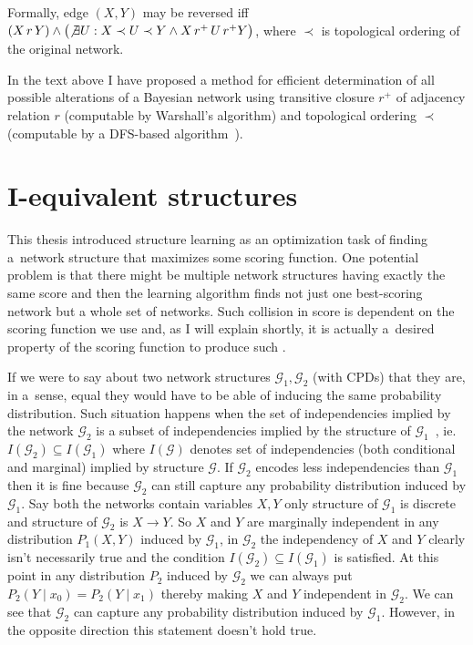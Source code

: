 \documentclass[english,cover]{fitthesis} %
\begin{document}
Formally, edge $(X,Y)$ may be reversed iff $(X \, r \, Y) \land \bigl(\not \exists U: X \prec U \prec Y \land X \, r^+ \, U \, r^+Y \bigr)$, where $\prec$ is topological ordering of the original network.

\medskip
In the text above I have proposed a method for efficient determination of all possible alterations of a Bayesian network using transitive closure $r^+$ of adjacency relation $r$ (computable by Warshall's algorithm) and topological ordering $\prec$ (computable by a DFS-based algorithm~\cite{cormen_introduction_to_algorithms}).






\section{I-equivalent structures}
This thesis introduced structure learning as an optimization task of finding a~network structure that maximizes some scoring function. One potential problem is that there might be multiple network structures having exactly the same score and then the learning algorithm finds not just one best-scoring network but a whole set of networks. Such collision in score is dependent on the scoring function we use and, as I will explain shortly, it is actually a~desired property of the scoring function to produce such .

If we were to say about two network structures $\mathcal{G}_1, \mathcal{G}_2$ (with CPDs) that they are, in a~sense, equal they would have to be able of inducing the same probability distribution. Such situation happens when the set of independencies implied by the network $\mathcal{G}_2$ is a subset of independencies implied by the structure of $\mathcal{G}_1$~\cite[p.~76]{pgm}, ie. $I(\mathcal{G}_2) \subseteq I(\mathcal{G}_1)$ where $I(\mathcal{G})$ denotes set of independencies (both conditional and marginal) implied by structure $\mathcal{G}$. If $\mathcal{G}_2$ encodes less independencies than $\mathcal{G}_1$ then it is fine because $\mathcal{G}_2$ can still capture any probability distribution induced by $\mathcal{G}_1$. Say both the networks contain variables $X,Y$ only structure of $\mathcal{G}_1$ is discrete and structure of $\mathcal{G}_2$ is $X \rightarrow Y$. So $X$ and $Y$ are marginally independent in any distribution $P_1(X,Y)$ induced by $\mathcal{G}_1$, in $\mathcal{G}_2$ the independency of $X$ and $Y$ clearly isn't necessarily true and the condition $I(\mathcal{G}_2) \subseteq I(\mathcal{G}_1)$ is satisfied. At this point in any distribution $P_2$ induced by $\mathcal{G}_2$ we can always put $P_2(Y \mid x_0) = P_2(Y \mid x_1)$ thereby making $X$ and $Y$ independent in $\mathcal{G}_2$. We can see that $\mathcal{G}_2$ can capture any probability distribution induced by $\mathcal{G}_1$. However, in the opposite direction this statement doesn't hold true.
\end{document}
